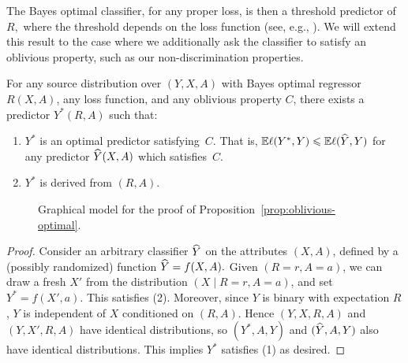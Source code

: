 The Bayes optimal classifier, for any proper loss, is then a threshold
predictor of~$R,$ where the threshold depends on the loss function
(see, e.g., \cite{Wasserman10}).  We will extend this result to the
case where we additionally ask the classifier to satisfy an oblivious
property, such as our non-discrimination properties.
%
\begin{proposition}
\label{lem:oblivious-optimal}
\label{prop:oblivious-optimal} For any source distribution over
$(Y,X,A)$ with Bayes optimal regressor $R(X,A)$, any loss function,
and any oblivious property $C$, there exists a predictor $Y^*(R,A)$
such that:
\begin{enumerate}
\item $Y^*$ is an optimal predictor satisfying~$C$.  That is,
  $\mathbb{E}\ell(Y^*,Y)\leqslant\mathbb{E}\ell(\widehat{Y},Y)$ for any predictor $\widehat{Y}(X,A)$
  which satisfies~$C$.
\item $Y^*$ is derived from $(R,A).$
\end{enumerate}
\end{proposition}
%
\begin{figure}[ht]
\begin{center}
\end{center}
    \caption{Graphical model for the proof of Proposition~\ref{prop:oblivious-optimal}.}
\label{fig:graphmodel}
\end{figure}
%
\begin{proof}
  Consider an arbitrary classifier $\widehat{Y}$ on the attributes $(X,A)$,
  defined by a (possibly randomized) function $\widehat{Y}=f(X,A).$ Given
  $(R=r, A=a)$, we can draw a fresh $X'$ from the distribution $(X
  \mid R=r, A=a)$, and set $Y^* = f(X', a)$.  This satisfies (2).
  Moreover, since $Y$ is binary with expectation $R$, $Y$ is
  independent of $X$ conditioned on $(R, A)$.  Hence $(Y, X, R, A)$
  and $(Y, X', R, A)$ have identical distributions, so $(Y^*, A, Y)$ and
  $(\widehat{Y}, A, Y)$ also have identical distributions.  This implies $Y^*$
  satisfies (1) as desired.
\end{proof}


